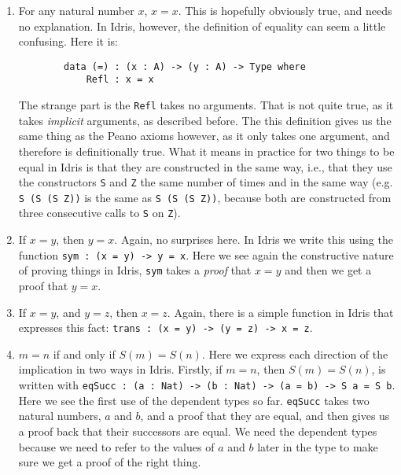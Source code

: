 \documentclass{article}
\newcommand{\inline}[1]{\texttt{#1}}
\begin{document}
\begin{enumerate}
    \item For any natural number $x$, $x = x$.
        This is hopefully obviously true, and needs no explanation.
        In Idris, however, the definition of equality can seem a little confusing.
        Here it is:

        \begin{verbatim}
        data (=) : (x : A) -> (y : A) -> Type where
            Refl : x = x
        \end{verbatim}

        The strange part is the \inline{Refl} takes no arguments.
        That is not quite true, as it takes \textit{implicit} arguments, as described before.
        The this definition gives us the same thing as the Peano axioms however, as it only takes one argument, and therefore is definitionally true.
        What it means in practice for two things to be equal in Idris is that they are constructed in the same way, i.e., that they use the constructors \inline{S} and \inline{Z} the same number of times and in the same way (e.g. \inline{S (S (S Z))} is the same as \inline{S (S (S Z))}, because both are constructed from three consecutive calls to \inline{S} on \inline{Z}).

    \item If $x = y$, then $y = x$.
        Again, no surprises here.
        In Idris we write this using the function \inline{sym : (x = y) -> y = x}.
        Here we see again the constructive nature of proving things in Idris, \inline{sym} takes a \textit{proof} that $x = y$ and then we get a proof that $y = x$.

    \item If $x = y$, and $y = z$, then $x = z$.
        Again, there is a simple function in Idris that expresses this fact: \inline{trans : (x = y) -> (y = z) -> x = z}.

    \item $m = n$ if and only if $S(m) = S(n)$.
        Here we express each direction of the implication in two ways in Idris.
        Firstly, if $m = n$, then $S(m) = S(n)$, is written with \inline{eqSucc : (a : Nat) -> (b : Nat) -> (a = b) -> S a = S b}.
        Here we see the first use of the dependent types so far.
        \inline{eqSucc} takes two natural numbers, $a$ and $b$, and a proof that they are equal, and then gives us a proof back that their successors are equal.
        We need the dependent types because we need to refer to the values of $a$ and $b$ later in the type to make sure we get a proof of the right thing.


\end{enumerate}
\end{document}
